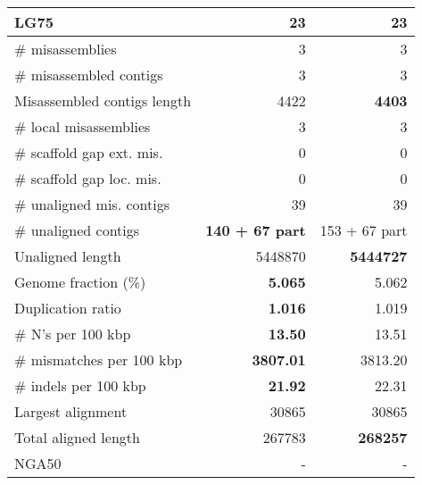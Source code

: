 \documentclass[12pt,a4paper]{article}
\begin{document}
\begin{table}[ht]
\begin{center}
\begin{tabular}{|l*{2}{|r}|}
LG75 & 23 & 23 \\ \hline
\# misassemblies & 3 & 3 \\ \hline
\# misassembled contigs & 3 & 3 \\ \hline
Misassembled contigs length & 4422 & {\bf 4403} \\ \hline
\# local misassemblies & 3 & 3 \\ \hline
\# scaffold gap ext. mis. & 0 & 0 \\ \hline
\# scaffold gap loc. mis. & 0 & 0 \\ \hline
\# unaligned mis. contigs & 39 & 39 \\ \hline
\# unaligned contigs & {\bf 140 + 67 part} & 153 + 67 part \\ \hline
Unaligned length & 5448870 & {\bf 5444727} \\ \hline
Genome fraction (\%) & {\bf 5.065} & 5.062 \\ \hline
Duplication ratio & {\bf 1.016} & 1.019 \\ \hline
\# N's per 100 kbp & {\bf 13.50} & 13.51 \\ \hline
\# mismatches per 100 kbp & {\bf 3807.01} & 3813.20 \\ \hline
\# indels per 100 kbp & {\bf 21.92} & 22.31 \\ \hline
Largest alignment & 30865 & 30865 \\ \hline
Total aligned length & 267783 & {\bf 268257} \\ \hline
NGA50 & - & - \\ \hline
\end{tabular}
\end{center}
\end{table}
\end{document}
